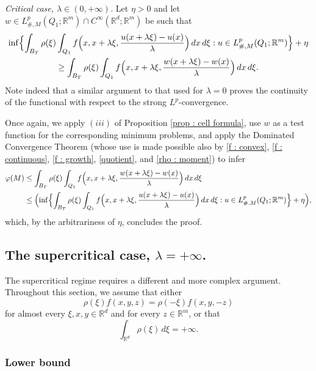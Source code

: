 \documentclass{article}
\theoremstyle{definition}
\newcommand{\f}{\varphi}
\newcommand{\R}{\mathbb{R}}
\begin{document}
\medskip

{\em Critical case, $\lambda\in(0,+\infty)$.} Let $\eta>0$ and let $w\in L^p_{\#,M}(Q_1; \R^m)\cap C^\infty(\R^d;\R^m)$ be such that
    \begin{multline*}
      \inf\Bigl\{ \int_{B_T} \rho(\xi)\int_{Q_1} f\Bigl(x,x+\lambda\xi,\frac{u(x+\lambda\xi)-u(x)}{\lambda}\Bigr)\, dx\, d\xi : u\in L^p_{\#,M}(Q_1;\R^m) \Bigr\} +\eta \\
      \geq \int_{B_T} \rho(\xi)\int_{Q_1} f\Bigl(x,x+\lambda\xi,\frac{w(x+\lambda\xi)-w(x)}{\lambda}\Bigr)\, dx\, d\xi.
    \end{multline*} 
Note indeed that a similar argument to that used for $\lambda=0$ proves the continuity of the functional with respect to the strong $L^p$-convergence.
  
  Once again, we apply $(iii)$ of Proposition \ref{prop : cell formula}, use $w$ as a test function for the corresponding minimum problems, and apply the Dominated Convergence Theorem (whose use is made possible also by \eqref{f : convex}, \eqref{f : continuous}, \eqref{f : growth}, \eqref{quotient}, and \eqref{rho : moment}) to infer
\begin{align*}
     \f(M)  & \leq  \int_{B_T} \rho(\xi)\int_{Q_1} f\Bigl(x,x+\lambda\xi,\frac{w(x+\lambda\xi)-w(x)}{\lambda} \Bigl)\, dx\,d\xi \\
     & \leq  \Bigl(\inf\Bigl\{ \int_{B_T} \rho(\xi)\int_{Q_1} f\Bigl(x,x+\lambda\xi,\frac{u(x+\lambda\xi)-u(x)}{\lambda}\Bigr)\, dx\, d\xi : u\in L^p_{\#,M}(Q_1;\R^m) \Bigr\} +\eta\Bigr),
\end{align*}
     which, by the arbitrariness of $\eta$, concludes the proof.


\subsection{The supercritical case, $\lambda=+\infty$.}

The supercritical regime requires a different and more complex argument. Throughout this section, we assume that either
\begin{equation*}
    \tag{H1}
       \rho(\xi)f(x,y,z)=\rho(-\xi)f(x,y,-z) 
    \end{equation*}
    for almost every $\xi,x,y\in \R^d$ and for every $z\in\R^m$, or that 
\begin{equation*}
    \tag{H2}
    \int_{\R^d}\rho(\xi)\,d\xi =+\infty.
\end{equation*}

\subsubsection{Lower bound}
\end{document}
